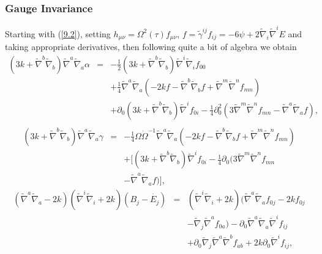 \subsubsection{Gauge Invariance}
\label{sss:establishing_gauge_invariance}

Starting with (\ref{9.2}), setting $h_{\mu\nu}=\Omega^2(\tau)f_{\mu\nu}$,  $f=\tilde{\gamma}^{ij}f_{ij}=-6\psi+2\tilde{\nabla}_i\tilde{\nabla}^iE$ and taking appropriate derivatives, then following quite a bit of algebra we obtain
%
\begin{eqnarray}
(3k+\tilde{\nabla}^b\tilde{\nabla}_b)\tilde{\nabla}^a\tilde{\nabla}_a\alpha&=&-\frac{1}{2}(3k+\tilde{\nabla}^b\tilde{\nabla}_b)\tilde{\nabla}^i\tilde{\nabla}_if_{00}
\nonumber\\
&&
+\frac{1}{4}\tilde{\nabla}^a\tilde{\nabla}_a\left(-2kf-\tilde{\nabla}^b\tilde{\nabla}_bf+\tilde{\nabla}^m\tilde{\nabla}^nf_{mn}\right)
\nonumber\\
&&
+\partial_0(3k+\tilde{\nabla}^b\tilde{\nabla}_b)\tilde{\nabla}^if_{0i}
-\frac{1}{4}\partial^2_0\left(3\tilde{\nabla}^m\tilde{\nabla}^nf_{mn}-\tilde{\nabla}^a\tilde{\nabla}_af\right),
\nonumber\\
\label{9.43a}
\end{eqnarray}
%
%
\begin{eqnarray}
(3k+\tilde{\nabla}^b\tilde{\nabla}_b)\tilde{\nabla}^a\tilde{\nabla}_a\gamma
&=&-\frac{1}{4}\Omega\dot{\Omega}^{-1}\tilde{\nabla}^a\tilde{\nabla}_a\left(-2kf-\tilde{\nabla}^b\tilde{\nabla}_bf+\tilde{\nabla}^m\tilde{\nabla}^nf_{mn}\right)
\nonumber\\
&&
+\bigg[(3k+\tilde{\nabla}^b\tilde{\nabla}_b)\tilde{\nabla}^if_{0i}-\frac{1}{4}\partial_0\big(3\tilde{\nabla}^m\tilde{\nabla}^nf_{mn}
\nonumber\\
&&-\tilde{\nabla}^a\tilde{\nabla}_af\big)\bigg],
\label{9.44a}
\end{eqnarray}
%
%
\begin{eqnarray}
(\tilde{\nabla}^a\tilde{\nabla}_a-2k)(\tilde{\nabla}^i\tilde{\nabla}_i +2k)(B_j-\dot{E_j})&=&(\tilde{\nabla}^i\tilde{\nabla}_i +2k)(\tilde{\nabla}^a\tilde{\nabla}_af_{0j}-2kf_{0j}
\nonumber\\
&&
-\tilde{\nabla}_j\tilde{\nabla}^af_{0a})
-\partial_0\tilde{\nabla}^a\tilde{\nabla}_a\tilde{\nabla}^if_{ij}
\nonumber\\
&&
+\partial_0\tilde{\nabla}_j\tilde{\nabla}^a\tilde{\nabla}^bf_{ab}
+2k\partial_0\tilde{\nabla}^if_{ij},
\label{9.45a}
\end{eqnarray}
%


